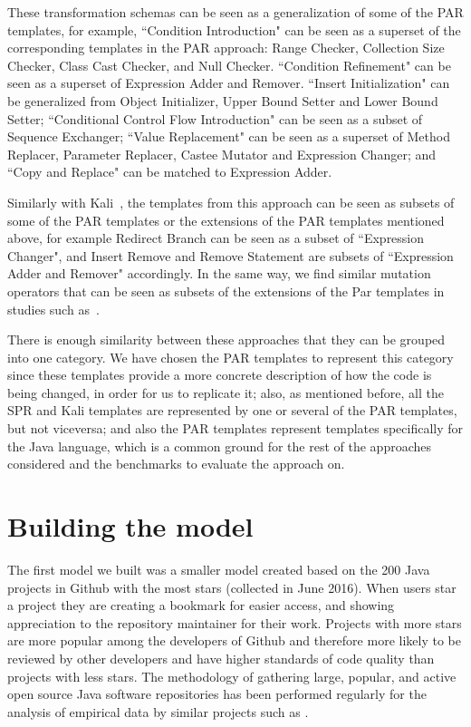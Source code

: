 \documentclass[conference]{IEEEtran}
\begin{document}
These transformation schemas can be seen as a generalization of some of the PAR 
templates, for example, ``Condition Introduction" can be seen as a superset of 
the corresponding templates in the PAR approach: Range Checker, Collection Size 
Checker, Class Cast Checker, and Null Checker. ``Condition Refinement" can be 
seen as a superset of 
Expression Adder and Remover. ``Insert Initialization" can be 
generalized from Object Initializer, Upper Bound Setter and Lower Bound Setter; ``Conditional Control Flow Introduction" can be 
seen as a subset of Sequence Exchanger;
``Value Replacement" can be seen as a superset of Method 
Replacer, Parameter Replacer, Castee Mutator and Expression Changer; and ``Copy 
and Replace" can be matched to Expression Adder. 

Similarly with Kali~\cite{Qi15}, the templates from this approach can be seen as subsets of some of the PAR templates or the extensions of the PAR templates mentioned above, for example Redirect Branch can be seen as a subset of ``Expression Changer", and Insert Remove and Remove Statement are subsets of ``Expression Adder and Remover" accordingly. In the same way, we find similar mutation operators that can be seen as subsets of the extensions of the Par templates in studies such as~\cite{Offutt96,Offutt06}.

There is enough similarity between these approaches that they can be grouped 
into one category. We have chosen the PAR templates to represent this category 
since these templates provide a more concrete description of how the code is 
being changed, in order for us to replicate it; also, as mentioned before, all the SPR and Kali templates are represented by one or several of the PAR templates, but not viceversa; and also the PAR templates represent templates specifically for the Java language, which is a common ground for the rest of the 
approaches considered and the benchmarks to evaluate the approach on.


\section{Building the model} \label{buildingTheModel}
The first model we built was a smaller model created based on the 200 Java projects in Github 
with the most stars (collected in June 2016). When users star a project they are creating a bookmark for 
easier access, and showing appreciation to the repository maintainer for their 
work. Projects with more stars are more popular among the developers of Github 
and therefore more likely to be reviewed by other developers and have higher 
standards of code quality than projects with less stars. The methodology of 
gathering large,
popular, and active open source Java software repositories has been performed 
regularly for the analysis of empirical data by similar projects such as 
\cite{Ray14}. 
\end{document}
